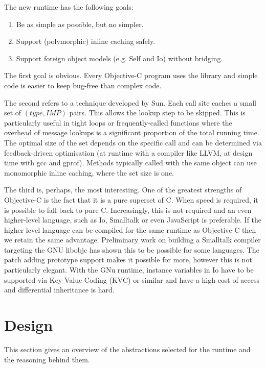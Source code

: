 \documentclass[10pt]{article}
\begin{document}
		The new runtime has the following goals:

		\begin{enumerate}
			\item Be as simple as possible, but no simpler.
			\item Support (polymorphic) inline caching safely.
			\item Support foreign object models (e.g. Self and Io) without bridging.
		\end{enumerate}

		The first goal is obvious.  Every Objective-C program uses the library and simple code is easier to keep bug-free than complex code.

		The second refers to a technique developed by Sun.  Each call site caches a small set of $(type, IMP)$ pairs.  This allows the lookup step to be skipped.  This is particularly useful in tight loops or frequently-called functions where the overhead of message lookups is a significant proportion of the total running time.  The optimal size of the set depends on the specific call and can be determined via feedback-driven optimisation (at runtime with a compiler like LLVM, at design time with gcc and gprof).  Methods typically called with the same object can use monomorphic inline caching, where the set size is one.  

		The third is, perhaps, the most interesting.  One of the greatest strengths of Objective-C is the fact that it is a pure superset of C.  When speed is required, it is possible to fall back to pure C.  Increasingly, this is not required and an even higher-level language, such as Io, Smalltalk or even JavaScript is preferable.  If the higher level language can be compiled for the same runtime as Objective-C then we retain the same advantage.  Preliminary work on building a Smalltalk compiler targeting the GNU libobjc has shown this to be possible for some languages.  The patch adding prototype support makes it possible for more, however this is not particularly elegant.  With the GNu runtime, instance variables in Io have to be supported via Key-Value Coding (KVC) or similar and have a high cost of access and differential inheritance is hard.

		\section{Design}
			
			This section gives an overview of the abstractions selected for the runtime and the reasoning behind them.
\end{document}
